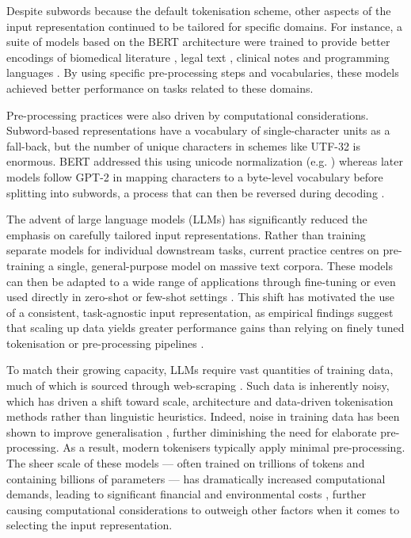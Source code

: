 Despite subwords because the default tokenisation scheme, other aspects of the input representation continued to be tailored for specific domains. For instance, a suite of models based on the BERT architecture were trained to provide better encodings of biomedical literature \citep{lee2020biobert}, legal text \citep{chalkidis2020legal}, clinical notes \citep{alsentzer2019publicly} and programming languages \citep{feng-etal-2020-codebert}. By using specific pre-processing steps and vocabularies, these models achieved better performance on tasks related to these domains.

Pre-processing practices were also driven by computational considerations. Subword-based representations have a vocabulary of single-character units as a fall-back, but the number of unique characters in schemes like UTF-32 is enormous. BERT addressed this using unicode normalization (e.g. \writemore) whereas later models follow GPT-2 \citep{radford-2019-gpt2} in mapping characters to a byte-level vocabulary before splitting into subwords, a process that can then be reversed during decoding \citep{wang2020neural}.  

The advent of large language models (LLMs) has significantly reduced the emphasis on carefully tailored input representations. Rather than training separate models for individual downstream tasks, current practice centres on pre-training a single, general-purpose model on massive text corpora. These models can then be adapted to a wide range of applications through fine-tuning or even used directly in zero-shot or few-shot settings \citep{raffel2020exploring}. This shift has motivated the use of a consistent, task-agnostic input representation, as empirical findings suggest that scaling up data yields greater performance gains than relying on finely tuned tokenisation or pre-processing pipelines \citep{brown-2020-gpt3}. 

To match their growing capacity, LLMs require vast quantities of training data, much of which is sourced through web-scraping \citep{bansal-2022-datascaling}. Such data is inherently noisy, which has driven a shift toward scale, architecture and data-driven tokenisation methods rather than linguistic heuristics. Indeed, noise in training data has been shown to improve generalisation \citep{zheng-saparov-2023-noisy}, further diminishing the need for elaborate pre-processing. As a result, modern tokenisers typically apply minimal pre-processing. The sheer scale of these models --- often trained on trillions of tokens and containing billions of parameters --- has dramatically increased computational demands, leading to significant financial and environmental costs \citep{strubell-etal-2019-energy, patterson2021carbonemissionslargeneural, bender2021parrots, luccioni2022estimatingcarbonfootprintbloom}, further causing computational considerations to outweigh other factors when it comes to selecting the input representation. 

